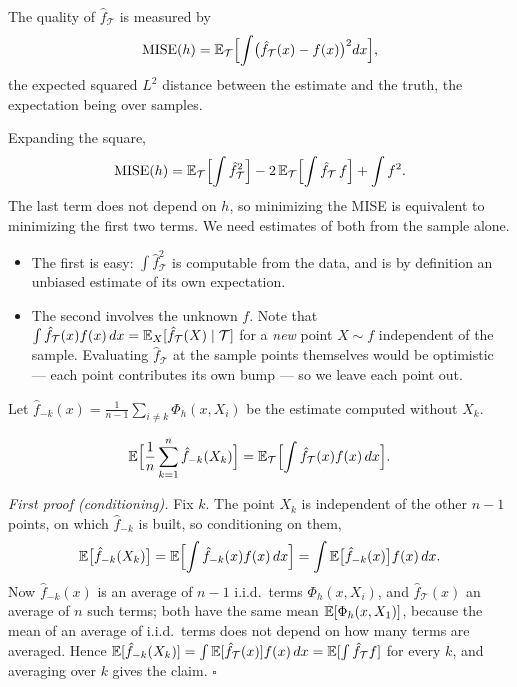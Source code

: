 \begin{notechapter}
\begin{definition}
The quality of $\hat f_{\mathcal T}$ is measured by
\[
  \mathrm{MISE}(h) = \mathbb{E}_{\mathcal T}\Bigl[\int\bigl(\hat f_{\mathcal T}(x) - f(x)\bigr)^2dx\Bigr],
\]
the expected squared $L^2$ distance between the estimate and the truth, the
expectation being over samples.
\end{definition}

Expanding the square,
\[
  \mathrm{MISE}(h) = \mathbb{E}_{\mathcal T}\Bigl[\int\hat f_{\mathcal T}^2\Bigr]
  - 2\,\mathbb{E}_{\mathcal T}\Bigl[\int\hat f_{\mathcal T}\,f\Bigr] + \int f^2 .
\]
The last term does not depend on $h$, so minimizing the MISE is equivalent to
minimizing the first two terms. We need estimates of both from the sample alone.
\begin{itemize}
  \item The first is easy: $\int\hat f_{\mathcal T}^2$ is computable from the
        data, and is by definition an unbiased estimate of its own expectation.
  \item The second involves the unknown $f$. Note that
        $\int\hat f_{\mathcal T}(x)f(x)\,dx = \mathbb{E}_X[\hat f_{\mathcal T}(X)\mid\mathcal T]$
        for a \emph{new} point $X\sim f$ independent of the sample. Evaluating
        $\hat f_{\mathcal T}$ at the sample points themselves would be optimistic
        --- each point contributes its own bump --- so we leave each point out.
\end{itemize}
Let $\hat f_{-k}(x) = \frac1{n-1}\sum_{i\neq k}\Phi_h(x, X_i)$ be the estimate
computed without $X_k$.

\begin{proposition}\label{measuring-performance:prop:loo}
\[
  \mathbb{E}\Bigl[\frac1n\sum_{k=1}^n\hat f_{-k}(X_k)\Bigr] = \mathbb{E}_{\mathcal T}\Bigl[\int\hat f_{\mathcal T}(x)f(x)\,dx\Bigr].
\]
\end{proposition}

\emph{First proof (conditioning).} Fix $k$. The point $X_k$ is independent of
the other $n-1$ points, on which $\hat f_{-k}$ is built, so conditioning on them,
\[
  \mathbb{E}\bigl[\hat f_{-k}(X_k)\bigr] = \mathbb{E}\Bigl[\int\hat f_{-k}(x)f(x)\,dx\Bigr]
  = \int\mathbb{E}\bigl[\hat f_{-k}(x)\bigr]f(x)\,dx .
\]
Now $\hat f_{-k}(x)$ is an average of $n-1$ i.i.d.\ terms $\Phi_h(x,X_i)$, and
$\hat f_{\mathcal T}(x)$ an average of $n$ such terms; both have the same mean
$\mathbb{E}[\Phi_h(x, X_1)]$, because the mean of an average of i.i.d.\ terms does not
depend on how many terms are averaged. Hence
$\mathbb{E}[\hat f_{-k}(X_k)] = \int\mathbb{E}[\hat f_{\mathcal T}(x)]f(x)\,dx = \mathbb{E}[\int\hat f_{\mathcal T}f]$
for every $k$, and averaging over $k$ gives the claim.
\hfill$\square$


\end{notechapter}
